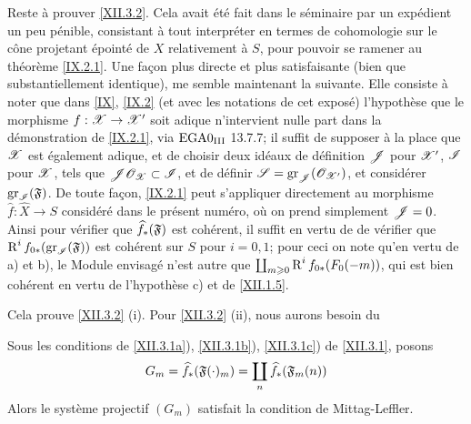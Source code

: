 Reste \`a prouver \ref{XII.3.2}. Cela avait \'et\'e fait dans le
s\'eminaire par un exp\'edient un peu p\'enible, consistant \`a tout
interpr\'eter en termes de cohomologie sur le c\^{o}ne projetant
\'epoint\'e de $X$ relativement \`a $S$, pour pouvoir se ramener au
th\'eor\`eme \ref{IX.2.1}. Une fa\c con plus directe et plus
satisfaisante (bien que substantiellement identique), me semble
maintenant la suivante. Elle consiste \`a noter que dans \ref{IX},
\numero \ref{IX.2}\label{XII.14} (et avec les
notations de cet expos\'e) l'hypoth\`ese que le morphisme
$f:\Xx\to\Xx'$ soit adique n'intervient nulle part dans la
d\'emonstration de \ref{IX.2.1}, via $\textup{EGA}\space 0_{\textup{III}}$ 13.7.7;
il suffit de supposer \`a la place que ${\mathscr X}$ est \'egalement adique,
et de choisir deux id\'eaux de d\'efinition ${\mathscr J}$ pour ${\mathscr X}'$, ${\mathscr I}$
pour ${\mathscr X}$, tels que ${\mathscr J}{\mathscr O}_{\mathscr X}\subset{\mathscr I}$, et de d\'efinir
${\mathscr S}=\operatorname{gr}_{\mathscr J}({\mathscr O}_{{\mathscr X}'})$, et consid\'erer $\operatorname{gr}_{\mathscr I}(\mathfrak{F})$. De
toute fa\c con, \ref{IX.2.1} peut s'appliquer directement au
morphisme $\widehat{f}:\widehat{X}\to S$ consid\'er\'e dans le pr\'esent
num\'ero, o\`u on prend simplement ${\mathscr J}=0$. Ainsi pour v\'erifier que
$\widehat{f}_\ast(\mathfrak{F})$ est coh\'erent, il suffit en vertu de
\loccit de v\'erifier que $\operatorname{R}^if_{0\ast}(\operatorname{gr}_{\mathscr I}(\mathfrak{F}))$ est
coh\'erent sur $S$ pour $i=0, 1$; pour ceci on note qu'en vertu de
a) et b), le Module envisag\'e n'est autre que
$\coprod_{m\geqslant 0}\operatorname{R}^if_{0\ast}(F_0(-m))$, qui
est bien coh\'erent en vertu de l'hypoth\`ese c) et de
\ref{XII.1.5}.

Cela prouve \ref{XII.3.2} (i). Pour \ref{XII.3.2} (ii), nous aurons besoin du

\begin{lemme} \label{XII.3.3}
Sous les conditions de \ref{XII.3.1a}), \ref{XII.3.1b}), \ref{XII.3.1c}) de \ref{XII.3.1}, posons
\[
G_m= \widehat{f}_\ast(\mathfrak{F}(\cdot)_m) = \coprod_n\widehat{f}_\ast(\mathfrak{F}_m(n))
\]
Alors le syst\`eme projectif $(G_m)$ satisfait la condition de Mittag-Leffler.
\end{lemme}

